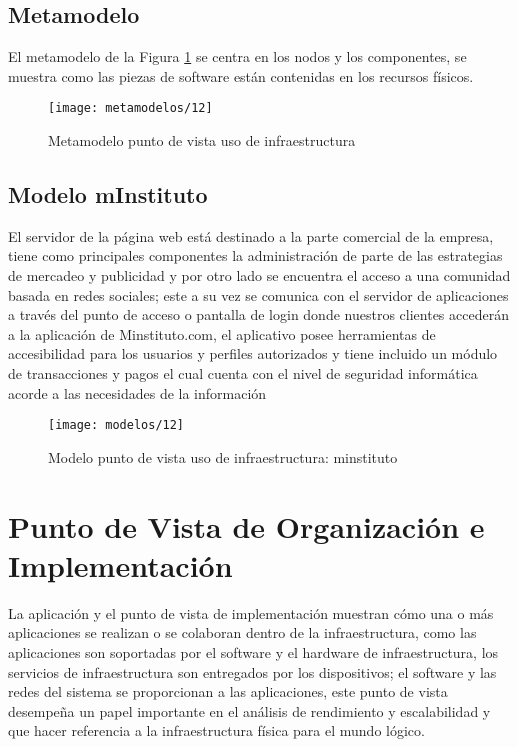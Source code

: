   \subsection{Metamodelo}
  El metamodelo de la Figura \ref{metamodelo12} se centra en los nodos y los componentes, se muestra como las piezas de software están contenidas en los recursos físicos. \cite{ref9}
  
  \begin{figure}[H]
  	\centering
  	\texttt{[image: metamodelos/12]}
  	\captionsetup{width=.95\textwidth}
  	\caption{Metamodelo punto de vista uso de infraestructura \cite{ref9}}
  	\label{metamodelo12}
  \end{figure}
  
  \subsection{Modelo mInstituto}
  El servidor de la página web está destinado a la parte comercial de la empresa, tiene como principales componentes la administración de parte de las estrategias de mercadeo y publicidad y por otro lado se encuentra el acceso a una comunidad basada en redes sociales; este a su vez se comunica con el servidor de aplicaciones a través del punto de acceso o pantalla de login donde nuestros clientes accederán a la aplicación de Minstituto.com, el aplicativo posee herramientas de accesibilidad para los usuarios y perfiles autorizados y tiene incluido un módulo de transacciones y pagos el cual cuenta con el nivel de seguridad informática acorde a las necesidades de la información
  
  \begin{figure}[H]
  	\centering
  	\texttt{[image: modelos/12]}
  	\captionsetup{width=.95\textwidth}
  	\caption{Modelo punto de vista uso de infraestructura: minstituto}
  	\label{modelo12}
  \end{figure}
  
  \section{Punto de Vista de Organización e Implementación}
  La aplicación y el punto de vista de implementación muestran cómo una o más aplicaciones se realizan o se colaboran dentro de la infraestructura, como las aplicaciones son soportadas por el software y el hardware de infraestructura, los servicios de infraestructura son entregados por los dispositivos; el software y las redes del sistema se proporcionan a las aplicaciones, este punto de vista desempeña un papel importante en el análisis de rendimiento y escalabilidad y que hacer referencia a la infraestructura física para el mundo lógico. \cite{ref9}
  
